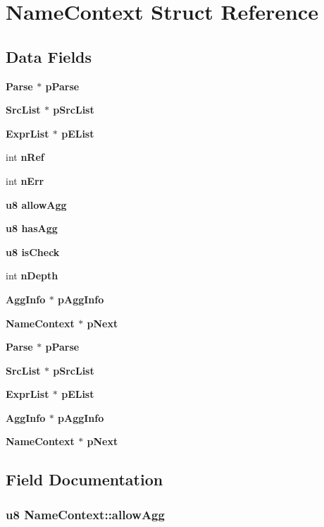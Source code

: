 \section{Name\-Context Struct Reference}
\label{structNameContext}
\subsection*{Data Fields}
\begin{CompactItemize}
\item 
\bf{Parse} $\ast$ \bf{p\-Parse}
\item 
\bf{Src\-List} $\ast$ \bf{p\-Src\-List}
\item 
\bf{Expr\-List} $\ast$ \bf{p\-EList}
\item 
int \bf{n\-Ref}
\item 
int \bf{n\-Err}
\item 
\bf{u8} \bf{allow\-Agg}
\item 
\bf{u8} \bf{has\-Agg}
\item 
\bf{u8} \bf{is\-Check}
\item 
int \bf{n\-Depth}
\item 
\bf{Agg\-Info} $\ast$ \bf{p\-Agg\-Info}
\item 
\bf{Name\-Context} $\ast$ \bf{p\-Next}
\item 
\bf{Parse} $\ast$ \bf{p\-Parse}
\item 
\bf{Src\-List} $\ast$ \bf{p\-Src\-List}
\item 
\bf{Expr\-List} $\ast$ \bf{p\-EList}
\item 
\bf{Agg\-Info} $\ast$ \bf{p\-Agg\-Info}
\item 
\bf{Name\-Context} $\ast$ \bf{p\-Next}
\end{CompactItemize}


\subsection{Field Documentation}
\subsubsection{\setlength{\rightskip}{0pt plus 5cm}\bf{u8} \bf{Name\-Context::allow\-Agg}}\label{structNameContext_12904180d9a604b454d50c66d17e9622}


